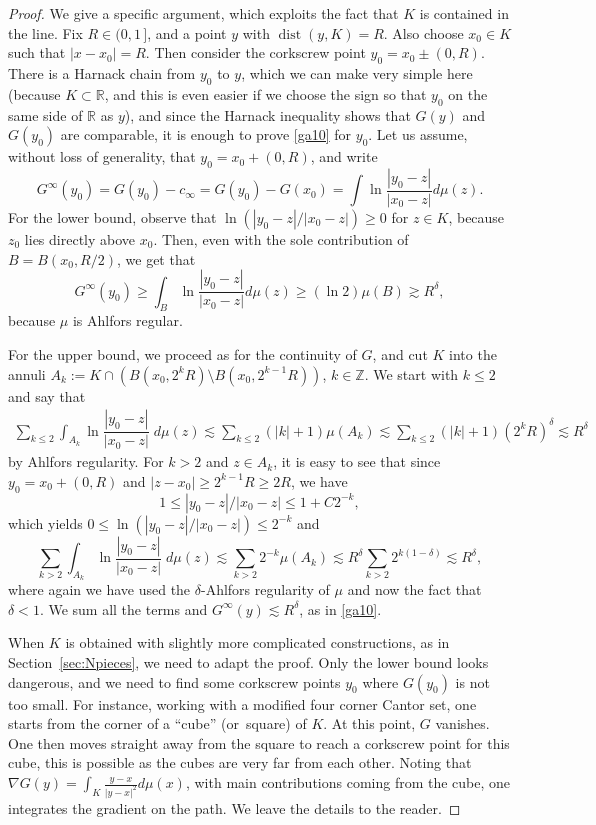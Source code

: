 \documentclass[10pt]{amsart}
\numberwithin{equation}{section}
\theoremstyle{plain}
\theoremstyle{definition}
\newcommand{\R}{\mathbb{R}}
\DeclareMathOperator{\dist}{dist}
\begin{document}
\begin{proof}
We give a specific argument, which exploits the fact that $K$ is contained in the line.
Fix $R\in (0,1\,]$, and a point $y$ with $\dist(y,K)=R$.
Also choose $x_0 \in K$ such that $|x-x_0| = R$. Then consider the corkscrew point
$y_0 = x_0 \pm (0,R)$. There is a Harnack chain from $y_0$ to $y$, which we can make very simple
here (because $K \subset \R$, and this is even easier if we choose the sign so that $y_0$ on the same side
of $\R$ as $y$), and since the Harnack inequality shows that $G(y)$ and $G(y_0)$ are comparable, it is enough
to prove \eqref{ga10} for $y_0$. Let us assume, without loss of generality, that $y_0 = x_0 + (0,R)$, and write
\[
G^\infty(y_0) = G(y_0)- c_\infty = G(y_0)-G(x_0)
= \int \ln \dfrac{|y_0-z|}{|x_0-z|}d \mu(z).
\]
For the lower bound, observe that $\ln(|y_0-z|/|x_0-z|) \ge 0$ for $z \in K$, because
$z_0$ lies directly above $x_0$. Then, even with the sole contribution of $B = B(x_0, R/2)$, we get that
\[
G^\infty(y_0) \geq \int_B \ln \dfrac{|y_0-z|}{|x_0-z|}d \mu(z)
\geq (\ln 2) \mu(B) \gtrsim R^\delta,
\]
because $\mu$ is Ahlfors regular.

For the upper bound, we proceed as for the continuity of $G$, and cut $K$ into the annuli
$ A_k := K \cap (B(x_0, 2^k R) \setminus B(x_0, 2^{k-1} R))$, $k \in \mathbb{Z}$.
We start with $k \leq 2$ and say that
\begin{align*}
\sum_{k \le 2} \int_{A_k} \ln \dfrac{|y_0-z|}{|x_0-z|} \; d\mu(z) \lesssim \sum_{k \le 2} (|k|+1) \mu(A_k)
\lesssim \sum_{k \le 2} (|k|+1) (2^k R)^\delta
\lesssim R^\delta
\end{align*}
by Ahlfors regularity.
For $k > 2$ and $z \in A_k$, it is easy to see that since $y_0 = x_0 + (0, R)$
and $|z-x_0| \geq 2^{k-1} R \geq 2R$, we have\vspace*{-3pt}
\[1 \leq |y_0-z|/|x_0-z| \leq 1 + C 2^{-k},
\]
which yields $0 \le \ln(|y_0-z|/|x_0-z|) \le 2^{-k}$ and\vspace*{-3pt}
\[
\sum_{k > 2} \int_{A_k} \ln \dfrac{|y_0-z|}{|x_0-z|} \; d\mu(z) \lesssim \sum_{k > 2} 2^{-k} \mu(A_k)
\lesssim R^\delta \sum_{k > 2} 2^{k(1-\delta)} \lesssim R^\delta,
\]
where again we have used the $\delta$-Ahlfors regularity of $\mu$ and now
the fact that $\delta <1$. We sum all the terms and $G^\infty(y) \lesssim R^\delta$, as in \eqref{ga10}.

When $K$ is obtained with slightly more complicated constructions, as in Section~\ref{sec:Npieces},
we need to adapt the proof.
Only the lower bound looks dangerous, and we need to find some corkscrew points $y_0$ where
$G(y_0)$ is not too small. For instance, working with a modified four corner Cantor set, one starts from the corner of a ``cube'' (or~square) of $K$. At this point, $G$ vanishes. One then moves straight away from the square to reach a corkscrew point for this cube, this is possible as the cubes are very far from each other. Noting that $\nabla G(y) = \int_K \frac{y-x}{|y-x|^2} d\mu(x)$, with main contributions coming from the cube, one integrates the gradient on the path. We leave the details to the reader.
\end{proof}
\end{document}
